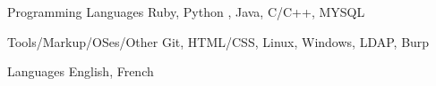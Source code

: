 

\begin{cvskills}

  \cvskill
    {Programming Languages} %
    {Ruby, Python , Java, C/C++, MYSQL} %

  \cvskill
    {Tools/Markup/OSes/Other} %
    {Git, HTML/CSS, Linux, Windows, LDAP, Burp} %

  \cvskill
    {Languages} %
    {English, French} %

\end{cvskills}